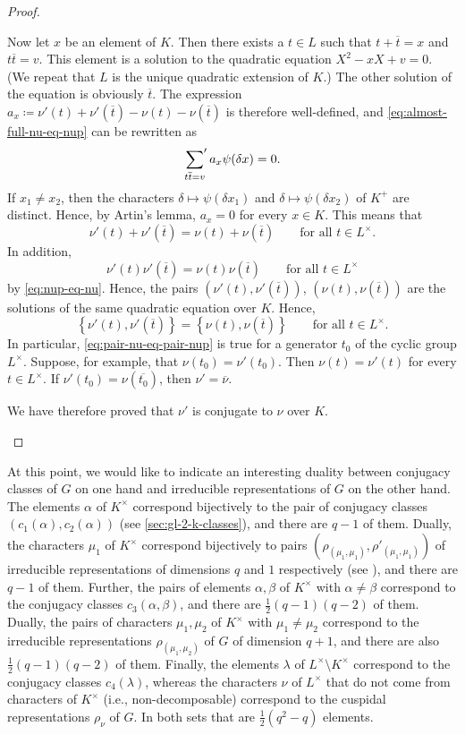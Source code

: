 \documentclass[../main.tex]{subfiles}
\begin{document}
\begin{proof}
\begin{listalph}
		Now let $x$ be an element of $K$. Then there exists a $t\in L$ such that $t+\overline t=x$ and $t\overline t=v$. This element is a solution to the quadratic equation $X^2-xX+v=0$. (We repeat that $L$ is the unique quadratic extension of $K$.) The other solution of the equation is obviously $\overline t$. The expression $a_x\coloneqq\nu'(t)+\nu'(\overline t)-\nu(t)-\nu(\overline t)$ is therefore well-defined, and \eqref{eq:almost-full-nu-eq-nup} can be rewritten as
		\[\sideset{}{'}\sum_{t\overline t=v}a_x\psi(\delta x)=0.\]
		If $x_1\ne x_2$, then the characters $\delta\mapsto\psi(\delta x_1)$ and $\delta\mapsto\psi(\delta x_2)$ of $K^+$ are distinct. Hence, by Artin's lemma, $a_x=0$ for every $x\in K$. This means that
		\[\nu'(t)+\nu'(\overline t)=\nu(t)+\nu(\overline t)\qquad\text{for all }t\in L^\times.\]
		In addition,
		\[\nu'(t)\nu'(\overline t)=\nu(t)\nu(\overline t)\qquad\text{for all }t\in L^\times\]
		by \eqref{eq:nup-eq-nu}. Hence, the pairs $\left(\nu'(t),\nu'(\overline t)\right)$, $\left(\nu(t),\nu(\overline t)\right)$ are the solutions of the same quadratic equation over $K$. Hence,
		\begin{equation}
			\left\{\nu'(t),\nu'(\overline t)\right\}=\left\{\nu(t),\nu(\overline t)\right\}\qquad\text{for all }t\in L^\times. \label{eq:pair-nu-eq-pair-nup}
		\end{equation}
		In particular, \eqref{eq:pair-nu-eq-pair-nup} is true for a generator $t_0$ of the cyclic group $L^\times$. Suppose, for example, that $\nu(t_0)=\nu'(t_0)$. Then $\nu(t)=\nu'(t)$ for every $t\in L^\times$. If $\nu'(t_0)=\nu(\overline{t_0})$, then $\nu'=\overline\nu$.

		We have therefore proved that $\nu'$ is conjugate to $\nu$ over $K$.
		\qedhere
	\end{listalph}
\end{proof}

At this point, we would like to indicate an interesting duality between conjugacy classes of $G$ on one hand and irreducible representations of $G$ on the other hand. The elements $\alpha$ of $K^\times$ correspond bijectively to the pair of conjugacy classes $(c_1(\alpha),c_2(\alpha))$ (see \cref{sec:gl-2-k-classes}), and there are $q-1$ of them. Dually, the characters $\mu_1$ of $K^\times$ correspond bijectively to pairs $\left(\rho_{(\mu_1,\mu_1)},\rho'_{(\mu_1,\mu_1)}\right)$ of irreducible representations of dimensions $q$ and $1$ respectively (see ), and there are $q-1$ of them. Further, the pairs of elements $\alpha,\beta$ of $K^\times$ with $\alpha\ne\beta$ correspond to the conjugacy classes $c_3(\alpha,\beta)$, and there are $\frac12(q-1)(q-2)$ of them. Dually, the pairs of characters $\mu_1,\mu_2$ of $K^\times$ with $\mu_1\ne\mu_2$ correspond to the irreducible representations $\rho_{(\mu_1,\mu_2)}$ of $G$ of dimension $q+1$, and there are also $\frac12(q-1)(q-2)$ of them. Finally, the elements $\lambda$ of $L^\times\setminus K^\times$ correspond to the conjugacy classes $c_4(\lambda)$, whereas the characters $\nu$ of $L^\times$ that do not come from characters of $K^\times$ (i.e., non-decomposable) correspond to the cuspidal representations $\rho_\nu$ of $G$. In both sets that are $\frac12\left(q^2-q\right)$ elements.
\end{document}
